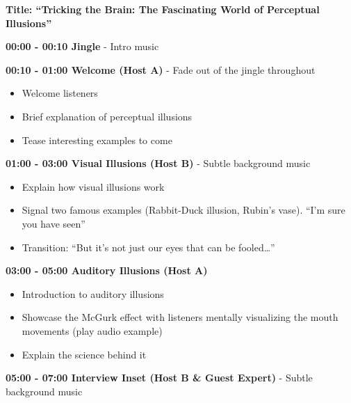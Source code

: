 \documentclass[
  letterpaper,
  DIV=11,
  numbers=noendperiod]{scrreprt}
\providecommand{\tightlist}{%
  \setlength{\itemsep}{0pt}\setlength{\parskip}{0pt}}\usepackage{longtable,booktabs,array}
\begin{document}
\begin{tcolorbox}[enhanced jigsaw, toptitle=1mm, colbacktitle=quarto-callout-note-color!10!white, breakable, leftrule=.75mm, titlerule=0mm, colframe=quarto-callout-note-color-frame, opacityback=0, arc=.35mm, opacitybacktitle=0.6, colback=white, title=\textcolor{quarto-callout-note-color}{\faInfo}\hspace{0.5em}{Podcast Outline}, toprule=.15mm, bottomtitle=1mm, coltitle=black, rightrule=.15mm, bottomrule=.15mm, left=2mm]

\textbf{Title: ``Tricking the Brain: The Fascinating World of Perceptual
Illusions''}

\textbf{00:00 - 00:10 \textbar{} Jingle} - Intro music

\textbf{00:10 - 01:00 \textbar{} Welcome (Host A) } - Fade out of the
jingle throughout

\begin{itemize}
\tightlist
\item
  Welcome listeners
\item
  Brief explanation of perceptual illusions
\item
  Tease interesting examples to come
\end{itemize}

\textbf{01:00 - 03:00 \textbar{} Visual Illusions (Host B)} - Subtle
background music

\begin{itemize}
\tightlist
\item
  Explain how visual illusions work
\item
  Signal two famous examples (Rabbit-Duck illusion, Rubin's vase). ``I'm
  sure you have seen''
\item
  Transition: ``But it's not just our eyes that can be fooled\ldots{}''
\end{itemize}

\textbf{03:00 - 05:00 \textbar{} Auditory Illusions (Host A)}

\begin{itemize}
\tightlist
\item
  Introduction to auditory illusions
\item
  Showcase the McGurk effect with listeners mentally visualizing the
  mouth movements (play audio example)
\item
  Explain the science behind it
\end{itemize}

\textbf{05:00 - 07:00 \textbar{} Interview Inset (Host B \& Guest
Expert)} - Subtle background music


\end{tcolorbox}
\end{document}
